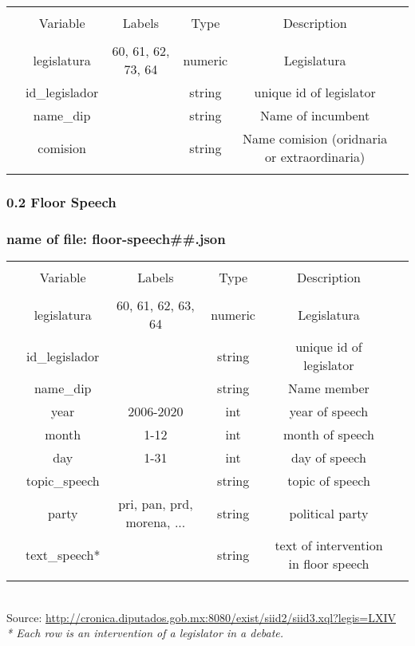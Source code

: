 \documentclass{article}
\begin{document}
\begin{table}[!htbp] \centering 
	
	\begin{tabular}{@{\extracolsep{5pt}} cccccc} 
		\\[-1.8ex]\hline 
		\hline \\[-1.8ex] 
		& Variable & Labels  & Type & Description \\ 
		\hline \\[-1.8ex] 
		& legislatura  &60, 61, 62, 73, 64 & numeric  & Legislatura   \\ 
		& id\_legislador  &   & string  & unique id of legislator   \\ 
		& name\_dip  &   & string  & Name of incumbent  \\ 
		& comision & & string  & Name comision (oridnaria or extraordinaria)  \\ 
		\hline \\[-1.8ex] 
	\end{tabular} 
\end{table} 

\subsubsection*{0.2 Floor Speech}
\subsubsection*{name of file: floor-speech\#\#.json}
\begin{table}[!htbp] \centering 
	\begin{tabular}{@{\extracolsep{5pt}} cccccc} 
		\\[-1.8ex]\hline 
		\hline \\[-1.8ex] 
		& Variable & Labels  & Type & Description \\ 
		\hline \\[-1.8ex] 
		& legislatura  &60, 61, 62, 63, 64 & numeric  & Legislatura   \\ 
		& id\_legislador  &   & string  & unique id of legislator   \\ 
		& name\_dip &   &string & Name member\\
		& year & 2006-2020  &  int & year of speech  \\ 
		& month  & 1-12  & int  & month of speech  \\ 
		& day & 1-31  & int & day of speech\\
		& topic\_speech&   & string & topic of speech\\
		& party & pri, pan, prd, morena, ...   & string& political party\\
		& text\_speech* &   & string& text of intervention in floor speech \\
		\hline
		 \\[-1.8ex] 
	\end{tabular} 
\\
Source:  \url{http://cronica.diputados.gob.mx:8080/exist/siid2/siid3.xql?legis=LXIV}\\
\textit{* Each row is an intervention of a legislator in a debate. }
\end{table} 
\end{document}
